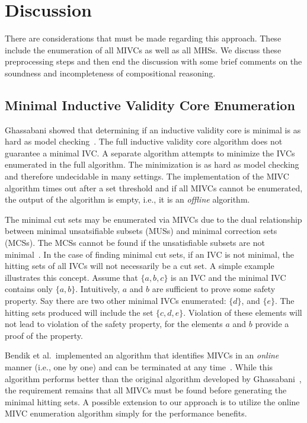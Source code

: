 \section{Discussion}
\label{sec:disc}
There are considerations that must be made regarding this approach. These include the enumeration of all MIVCs as well as all MHSs. We discuss these preprocessing steps and then end the discussion with some brief comments on the soundness and incompleteness of compositional reasoning. 

\subsection{Minimal Inductive Validity Core Enumeration}
Ghassabani showed that determining if an inductive validity core is minimal is as hard as model checking~\cite{ghassabani_2018, Ghassabani2017EfficientGO}. The full inductive validity core algorithm does not guarantee a minimal IVC. A separate algorithm attempts to minimize the IVCs enumerated in the full algorithm. The minimization is as hard as model checking and therefore undecidable in many settings. The implementation of the MIVC algorithm times out after a set threshold and if all MIVCs cannot be enumerated, the output of the algorithm is empty, i.e., it is an {\em offline} algorithm. 

The minimal cut sets may be enumerated via MIVCs due to the dual relationship between minimal unsatsifiable subsets (MUSs) and minimal correction sets (MCSs). The MCSs cannot be found if the unsatisfiable subsets are not minimal~\cite{liffiton2016fast}. In the case of finding minimal cut sets, if an IVC is not minimal, the hitting sets of all IVCs will not necessarily be a cut set. A simple example illustrates this concept. Assume that $\{a,b,c\}$ is an IVC and the minimal IVC contains only $\{a,b\}$. Intuitively, $a$ and $b$ are sufficient to prove some safety property. Say there are two other minimal IVCs enumerated: $\{d\}$, and $\{e\}$.  The hitting sets produced will include the set $\{c, d, e\}$. Violation of these elements will not lead to violation of the safety property, for the elements $a$ and $b$ provide a proof of the property. 

Bendik et al.~implemented an algorithm that identifies MIVCs in an {\em online} manner (i.e., one by one) and can be terminated at any time~\cite{bendik2018online}. While this algorithm performs better than the original \aivcalg algorithm developed by Ghassabani~\cite{Ghassabani2017EfficientGO}, the requirement remains that all MIVCs must be found before generating the minimal hitting sets. A possible extension to our approach is to utilize the online MIVC enumeration algorithm simply for the performance benefits. 

